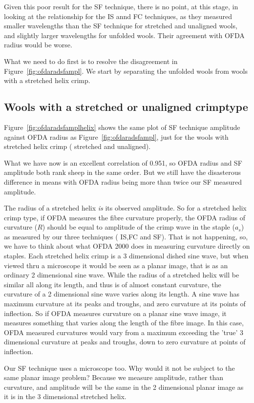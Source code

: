 \documentclass[titlepage,10pt]{article}  %
\begin{document}
Given this poor result for the SF technique, there is no point, at this stage, in looking at the relationship for the IS annd FC techniques, as they measured smaller wavelengths than the SF technique for stretched and unaligned wools, and slightly larger wavelengths for unfolded wools. Their agreement with OFDA radius would be worse.

What we need to do first is to resolve the disagreement in Figure~\ref{fig:ofdaradsfampl}. We start by separating the unfolded wools from wools with a stretched helix crimp.

\subsection{Wools with a stretched or unaligned crimptype}
 Figure~\ref{fig:ofdaradsfamplhelix} shows  the same plot of SF technique amplitude against OFDA radius as Figure~\ref{fig:ofdaradsfampl}, just for the wools with stretched helix crimp ( stretched and unaligned).

What we have now is an excellent correlation of 0.951, so OFDA radius and SF amplitude both rank sheep in the same order. But we still have the disasterous difference in means with OFDA radius being more than twice our SF measured amplitude.

The radius of a stretched helix {\em is} its observed amplitude. So for a stretched helix crimp type, if OFDA measures the fibre curvature properly, the OFDA radius of curvature ($R$) should be equal to amplitude of the crimp wave in the staple ($a_{s}$) as measured by our three techniques ( IS,FC and SF). That is not happening, so, we have to think about what OFDA 2000 does in measuring curvature directly on staples.  Each stretched helix crimp is a 3 dimensional dished sine wave, but when viewed thru a microscope it would be seen as a planar image, that is as an ordinary 2 dimensional sine wave. While the radius of a stretched helix will be similar all along its length, and thus is of almost constant curvature, the curvature of a 2 dimensional sine wave varies along its length. A sine wave has maximum curvature at its peaks and troughs, and zero curvature at its points of inflection. So if OFDA measures curvature on a planar sine wave image, it measures something that varies along the length of the fibre image.  In this case, OFDA measured curvatures would vary from a maximum exceeding the 'true' 3 dimensional curvature at peaks and troughs, down to zero curvature at points of inflection.


Our SF technique uses a microscope too. Why would it not be subject to the same planar image problem? Because we measure amplitude, rather than curvature, and amplitude will be the same in the 2 dimensional planar image as it is in the 3 dimensional stretched helix.
\end{document}
